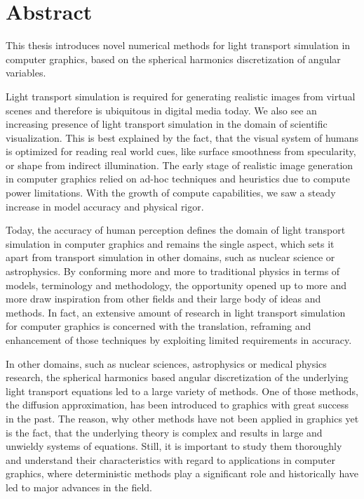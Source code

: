 \chapter*{Abstract}
%
%
This thesis introduces novel numerical methods for light transport simulation in computer graphics, based on the spherical harmonics discretization of angular variables.

Light transport simulation is required for generating realistic images from virtual scenes and therefore is ubiquitous in digital media today. We also see an increasing presence of light transport simulation in the domain of scientific visualization. This is best explained by the fact, that the visual system of humans is optimized for reading real world cues, like surface smoothness from specularity, or shape from indirect illumination. The early stage of realistic image generation in computer graphics relied on ad-hoc techniques and heuristics due to compute power limitations. With the growth of compute capabilities, we saw a steady increase in model accuracy and physical rigor.

Today, the accuracy of human perception defines the domain of light transport simulation in computer graphics and remains the single aspect, which sets it apart from transport simulation in other domains, such as nuclear science or astrophysics. By conforming more and more to traditional physics in terms of models, terminology and methodology, the opportunity opened up to more and more draw inspiration from other fields and their large body of ideas and methods. In fact, an extensive amount of research in light transport simulation for computer graphics is concerned with the translation, reframing and enhancement of those techniques by exploiting limited requirements in accuracy.

In other domains, such as nuclear sciences, astrophysics or medical physics research, the spherical harmonics based angular discretization of the underlying light transport equations led to a large variety of methods. One of those methods, the diffusion approximation, has been introduced to graphics with great success in the past. The reason, why other methods have not been applied in graphics yet is the fact, that the underlying theory is complex and results in large and unwieldy systems of equations. Still, it is important to study them thoroughly and understand their characteristics with regard to applications in computer graphics, where deterministic methods play a significant role and historically have led to major advances in the field.

